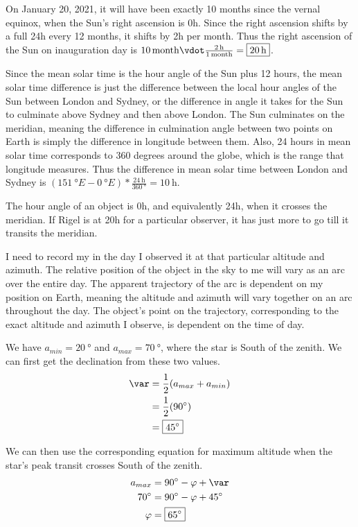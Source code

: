 \documentclass{homework}
\begin{document}
\question
On January 20, 2021, it will have been exactly 10 months since the vernal equinox, when the Sun's right ascension is 0h. Since the right ascension shifts by a full 24h every 12 months, it shifts by 2h per month. Thus the right ascension of the Sun on inauguration day is $\SI{10}{month} \vdot \frac{\SI{2}{\hour}}{\SI{1}{month}} = \boxed{\SI{20}{\hour}}$.

\question
Since the mean solar time is the hour angle of the Sun plus 12 hours, the mean solar time difference is just the difference between the local hour angles of the Sun between London and Sydney, or the difference in angle it takes for the Sun to culminate above Sydney and then above London. The Sun culminates on the meridian, meaning the difference in culmination angle between two points on Earth is simply the difference in longitude between them. Also, 24 hours in mean solar time corresponds to 360 degrees around the globe, which is the range that longitude measures. Thus the difference in mean solar time between London and Sydney is $(\SI{151}{\degree} E - \SI{0}{\degree} E) * \frac{\SI{24}{\hour}}{\SI{360}{\degree}} = \boxed{\SI{10}{\hour}}$.

\question
The hour angle of an object is 0h, and equivalently 24h, when it crosses the meridian. If Rigel is at 20h for a particular observer, it has just  more to go till it transits the meridian.

\question
I need to record my  in the day I observed it at that particular altitude and azimuth. The relative position of the object in the sky to me will vary as an arc over the entire day. The apparent trajectory of the arc is dependent on my position on Earth, meaning the altitude and azimuth will vary together on an arc throughout the day. The object's point on the trajectory, corresponding to the exact altitude and azimuth I observe, is dependent on the time of day.

\question
We have $a_{min} = \SI{20}{\degree}$ and $a_{max} = \SI{70}{\degree}$, where the star is South of the zenith. We can first get the declination from these two values.
\begin{align*}
    \var	&= 	\frac{1}{2} (a_{max} + a_{min})\\
            &=  \frac{1}{2} (\SI{90}{\degree})  \\
            &=  \boxed{\SI{45}{\degree}}
\end{align*}

We can then use the corresponding equation for maximum altitude when the star's peak transit crosses South of the zenith.
\begin{align*}
    a_{max}	&= 	\SI{90}{\degree} - \varphi + \var   \\
    \SI{70}{\degree}    &=  \SI{90}{\degree} - \varphi + \SI{45}{\degree}   \\
    \varphi &=  \boxed{\SI{65}{\degree}}
\end{align*}
\end{document}
